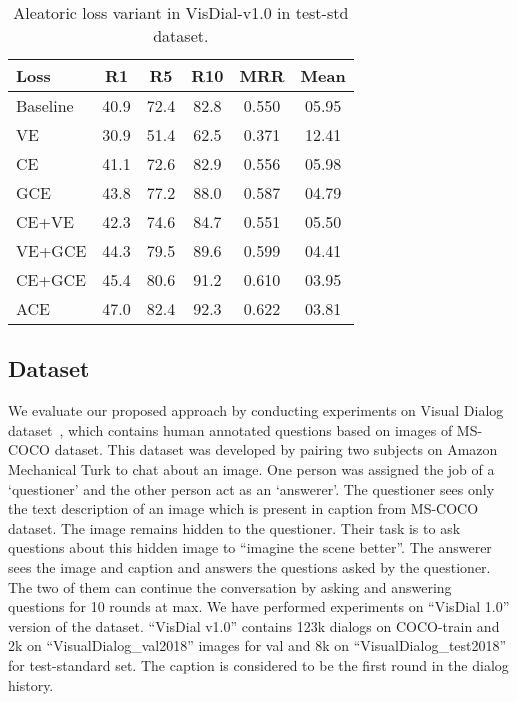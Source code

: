 \documentclass[review]{elsarticle}
\begin{document}
\begin{table}[!htb]
	\centering
\begin{tabular}{|p{1.4cm}|c|c|c|c|c|}
		\hline
		\textbf{Loss}&  \textbf{R1} & \textbf{R5} & \textbf{R10}& \textbf{MRR} & \textbf{Mean}\\
		\hline
		Baseline & 40.9& 72.4&82.8 &0.550 & 05.95\\
		VE      &30.9&51.4 &62.5&0.371& 12.41\\
		CE      &41.1& 72.6&82.9 &0.556 &05.98\\
		GCE     &43.8&77.2 &88.0&0.587& 04.79\\\hline
		CE+VE   &42.3&74.6 &84.7&0.551& 05.50\\ 
		VE+GCE  &44.3&79.5 &89.6&0.599& 04.41\\
		CE+GCE  &45.4&80.6 &91.2&0.610& 03.95\\ \hline
		ACE     &47.0& 82.4 &92.3 &0.622 & 03.81\\\hline
\end{tabular}
\caption{\label{tab_var_loss} Aleatoric loss variant in VisDial-v1.0 in test-std dataset.}
\end{table}



\subsection{Dataset}
We evaluate our proposed approach by conducting experiments on  Visual Dialog dataset~\cite{Das_CVPR2017}, which contains human annotated questions based on images of MS-COCO dataset.  This dataset was developed by pairing two subjects on Amazon Mechanical Turk to chat about an image. One person was assigned the job of a `questioner' and the other person act as an `answerer'. The questioner sees only the text description of an image which is present in caption from MS-COCO dataset. The image remains hidden to the questioner. Their task is to ask questions about this hidden image to ``imagine the scene better''. The answerer sees the image and caption and answers the questions asked by the questioner. The two of them can continue the conversation by asking and answering questions for 10 rounds at max. We have performed experiments on ``VisDial 1.0'' version of the dataset.
``VisDial v1.0'' contains 123k dialogs on COCO-train and 2k on ``VisualDialog\_val2018'' images for val and 8k on ``VisualDialog\_test2018'' for test-standard set. The caption is considered to be the first round in the dialog history. 
\end{document}
